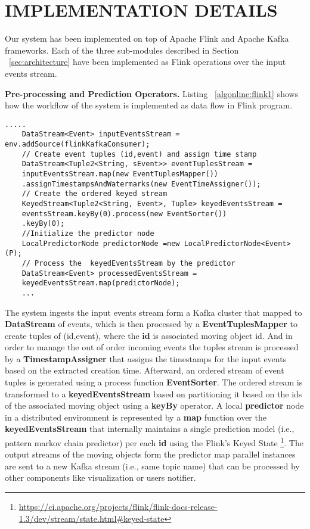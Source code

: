 

\section{IMPLEMENTATION DETAILS}

Our system has been implemented on top of Apache Flink and Apache Kafka frameworks. Each of the three sub-modules described in Section  ~\ref{sec:architecture} have been implemented as Flink operations over the input events stream. 

\textbf{Pre-processing and Prediction Operators.} Listing ~\ref{algonline:flink1} shows how the workflow of the system is implemented as data flow in Flink program.


	\begin{lstlisting}[caption={Flink pipeline for local predictors workflow},label={algonline:flink1},frame=single]
	.....
	DataStream<Event> inputEventsStream = env.addSource(flinkKafkaConsumer);	
	// Create event tuples (id,event) and assign time stamp 
	DataStream<Tuple2<String, sEvent>> eventTuplesStream =
	inputEventsStream.map(new EventTuplesMapper())
	.assignTimestampsAndWatermarks(new EventTimeAssigner());	
	// Create the ordered keyed stream 
	KeyedStream<Tuple2<String, Event>, Tuple> keyedEventsStream =
	eventsStream.keyBy(0).process(new EventSorter())
	.keyBy(0);	
	//Initialize the predictor node 
	LocalPredictorNode predictorNode =new LocalPredictorNode<Event>(P);
	// Process the  keyedEventsStream by the predictor 
	DataStream<Event> processedEventsStream =
	keyedEventsStream.map(predictorNode);
	...
	\end{lstlisting}
	
The system ingests the input events stream form a Kafka cluster that mapped to \textbf{DataStream} of events, which is then processed by a \textbf{EventTuplesMapper} to create tuples of (id,event), where the  \textbf{id} is associated moving object id. And in order to manage the out of order incoming events the tuples stream is processed by a \textbf{TimestampAssigner} that assigns the timestamps for the input events  based on the extracted creation time. Afterward,  an ordered stream of event tuples is generated using a process function \textbf{EventSorter}. The ordered stream is transformed to a \textbf{keyedEventsStream} based on partitioning it based on the ids of the associated moving object using a \textbf{keyBy} operator. A local \textbf{predictor} node in a distributed environment is represented by a \textbf{map} function over the \textbf{keyedEventsStream} that internally maintains a single prediction model (i.e., pattern markov chain predictor) per each \textbf{id} using the Flink's Keyed State \footnote{\url{https://ci.apache.org/projects/flink/flink-docs-release-1.3/dev/stream/state.html\#keyed-state}}. The output streams of the moving objects form the predictor map parallel instances are sent to a new Kafka stream (i.e., same topic name) that can be processed by other components like visualization or users notifier.


